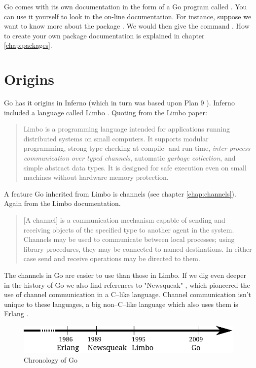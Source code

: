Go comes with its own documentation in the form of a Go program called
. 
You can use it yourself to look
in the on-line documentation. For
instance, suppose we want to know more about the package .
We would then give the command .
How to create your own package documentation
is explained in chapter \ref{chap:packages}.

\section{Origins}
Go has it origins in Inferno \cite{inferno} (which in turn was based
upon Plan 9 \cite{plan9}). Inferno included a language called Limbo
\cite{limbo}. Quoting from the Limbo paper:
\begin{quote}
Limbo is a programming language intended for applications running
distributed systems on small computers. It supports modular programming,
strong type checking at compile- and run-time, \emph{inter process
communication over typed channels}, automatic \emph{garbage collection}, and
simple abstract data types. It is designed for safe execution even on
small machines without hardware memory protection.
\end{quote}
A feature Go inherited from Limbo is channels (see chapter
\ref{chap:channels}). Again from the Limbo documentation.
\begin{quote}
[A channel] is a communication mechanism capable of sending and receiving objects of
the specified type to another agent in the system. Channels may be used
to communicate between local processes; using library procedures, they
may be connected to named destinations. In either case send and receive
operations may be directed to them.
\end{quote}
The channels in Go are easier to use than those in Limbo.
If we dig even deeper in the history of Go we also find references
to "Newsqueak" \cite{newsqueak}, which pioneered the use of 
channel communication in a C--like language. Channel
communication isn't unique to these languages, a big non--C--like
language which also uses them is Erlang \cite{erlang}.

\begin{figure}[H]
\caption{Chronology of Go}
\label{fig:chrono-of-go}
\begin{center}
\includegraphics[scale=0.65]{fig/go-history.pdf}
\end{center}
\end{figure}

